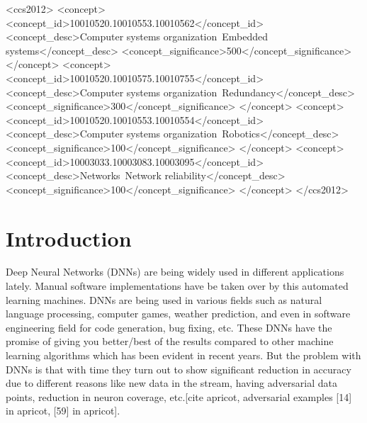 \documentclass[sigconf,authordraft]{acmart}
\begin{document}
\begin{CCSXML}
<ccs2012>
 <concept>
  <concept_id>10010520.10010553.10010562</concept_id>
  <concept_desc>Computer systems organization~Embedded systems</concept_desc>
  <concept_significance>500</concept_significance>
 </concept>
 <concept>
  <concept_id>10010520.10010575.10010755</concept_id>
  <concept_desc>Computer systems organization~Redundancy</concept_desc>
  <concept_significance>300</concept_significance>
 </concept>
 <concept>
  <concept_id>10010520.10010553.10010554</concept_id>
  <concept_desc>Computer systems organization~Robotics</concept_desc>
  <concept_significance>100</concept_significance>
 </concept>
 <concept>
  <concept_id>10003033.10003083.10003095</concept_id>
  <concept_desc>Networks~Network reliability</concept_desc>
  <concept_significance>100</concept_significance>
 </concept>
</ccs2012>
\end{CCSXML}





\maketitle

\section{Introduction}
Deep Neural Networks (DNNs) are being widely used in different applications lately. Manual software implementations have be taken over by this automated learning machines. DNNs are being used in various fields such as natural language processing, computer games, weather prediction, and even in software engineering field for code generation, bug fixing, etc. These DNNs have the promise of giving you better/best of the results compared to other machine learning algorithms which has been evident in recent years. But the problem with DNNs is that with time they turn out to show significant reduction in accuracy due to different reasons like new data in the stream, having adversarial data points, reduction in neuron coverage, etc.[cite apricot, adversarial examples [14] in apricot, [59] in apricot].
 
\end{document}
